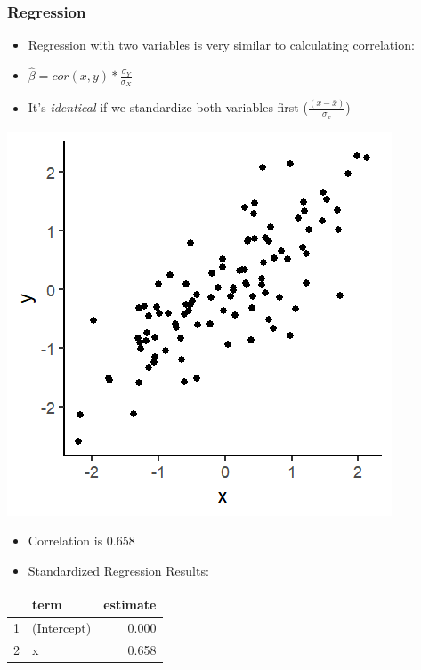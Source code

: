 \documentclass[xcolor=x11names,compress]{beamer}\usepackage[]{graphicx}\usepackage[]{color}
\makeatletter
\def\maxwidth{ %
  \ifdim\Gin@nat@width>\linewidth
    \linewidth
  \else
    \Gin@nat@width
  \fi
}
\newenvironment{knitrout}{}{} %
\renewcommand{\(}{\begin{columns}}
\renewcommand{\)}{\end{columns}}
\newcommand{\<}[1]{\begin{column}{#1}}
\renewcommand{\>}{\end{column}}
\makeatother
\begin{document}
\begin{frame}
\frametitle{Regression}
\begin{itemize}
\item Regression with two variables is very similar to calculating correlation:
\item $\hat{\beta}=cor(x,y) * \frac{\sigma_Y}{\sigma_X}$
\item It's \textit{identical} if we standardize both variables first ($\frac{(x-\bar{x})}{\sigma_x}$)
\end{itemize}
\begin{multicols}{2}
\begin{knitrout}
\color{fgcolor}
\includegraphics[width=\maxwidth]{figure/corr_regn_fig3-1} 

\end{knitrout}
\columnbreak
\begin{itemize}
\item Correlation is 0.658
\item Standardized Regression Results:
\end{itemize}
\begin{table}[ht]
\centering
\begin{tabular}{rlr}
  \hline
 & term & estimate \\ 
  \hline
1 & (Intercept) & 0.000 \\ 
  2 & x & 0.658 \\ 
   \hline
\end{tabular}
\end{table}

\end{multicols}
\end{frame}
\end{document}
